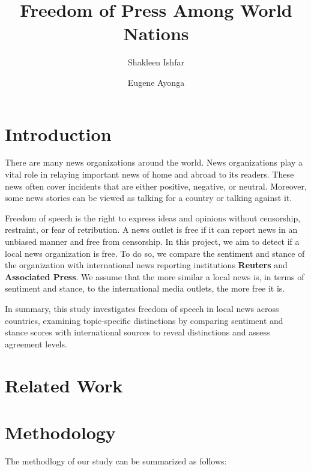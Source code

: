 \documentclass{article}
\title{Freedom of Press Among World Nations}
\author{Shakleen Ishfar \and Eugene Ayonga}
\theoremstyle{mytheoremstyle}
\theoremstyle{mytheoremstyle}
\theoremstyle{myproblemstyle}
\begin{document}
    \maketitle

    \section{Introduction}

    There are many news organizations around the world. News organizations play a vital role in relaying important news of home and abroad to its readers. These news often cover incidents that are either positive, negative, or neutral. Moreover, some news stories can be viewed as talking for a country or talking against it. 

    Freedom of speech is the right to express ideas and opinions without censorship, restraint, or fear of retribution. A news outlet is free if it can report news in an unbiased manner and free from censorship. In this project, we aim to detect if a local news organization is free. To do so, we compare the sentiment and stance of the organization with international news reporting institutions \textbf{Reuters} and \textbf{Associated Press}. We assume that the more similar a local news is, in terms of sentiment and stance, to the international media outlets, the more free it is. 
    
    In summary, this study investigates freedom of speech in local news across countries, examining topic-specific distinctions by comparing sentiment and stance scores with international sources to reveal distinctions and assess agreement levels.

    \section{Related Work}

    \section{Methodology}

    The methodlogy of our study can be summarized as follows:
\end{document}
